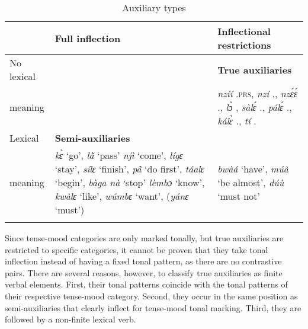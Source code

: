 \begin{table}
\begin{tabularx}{\textwidth}{l QQ}
\lsptoprule
			& 	Full inflection 	& Inflectional restrictions \\
 \midrule
No lexical  & 	& {\bfseries True auxiliaries} \\
meaning		  & 	& {\itshape nzíí} {\PROG}.\textsc{prs},
		  {\itshape nzí} {\PROG}.{\PST},
		  {\itshape nzɛ́ɛ́} {\PROG}.{\SUBORD},
		  {\itshape lɔ̀} {\RETRO},
		  {\itshape sàlɛ́} {\NEG}.{\PST},
		  {\itshape pálɛ́} {\NEG}.{\PST},
		  {\itshape kálɛ̀} {\NEG}.{\FUT},
		  {\itshape tí} {\NEG}.{\IMP}  \\
				\midrule
Lexical 	 & {\bfseries Semi-auxiliaries} & \\
meaning                 & 	{\itshape kɛ̀} `go', {\itshape lã̀} `pass'
			{\itshape njì} `come', {\itshape lígɛ} `stay',
			{\itshape sílɛ} `finish', {\itshape pã̂} `do first',
			{\itshape táalɛ} `begin', {\itshape bàga nà} `stop'
                        {\itshape lèmbɔ} `know', {\itshape kwàlɛ} `like',
			{\itshape wúmbɛ} `want', ({\itshape yánɛ} `must')    &   {\itshape bwàá} `have',
                                                                                {\itshape múà} `be almost',
                                                                                {\itshape dúù} `must not' \\
\lspbottomrule
\end{tabularx}
\caption{Auxiliary types}
\label{Tab:AUX}
\end{table}


Since tense-mood categories are only marked tonally, but true auxiliaries are restricted to specific categories, it cannot be proven that they take tonal inflection instead of having a fixed tonal pattern, as there are no contrastive pairs. There are several reasons, however, to classify true auxiliaries as finite verbal elements. First, their tonal patterns coincide with the tonal patterns of their respective tense-mood category. Second, they occur in the same position as semi-auxiliaries that clearly inflect for tense-mood tonal marking. Third, they are followed by a non-finite lexical verb.

